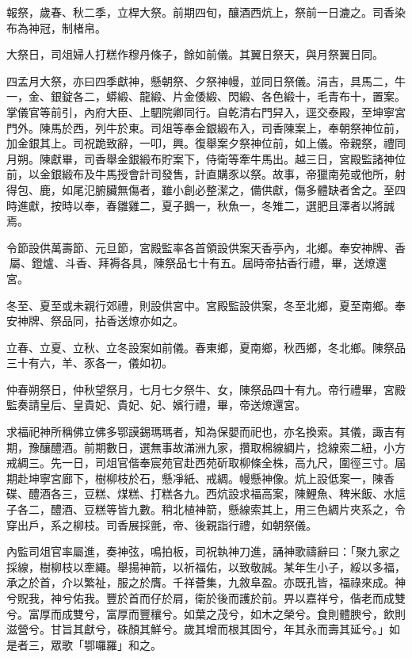 \begin{pinyinscope}
報祭，歲春、秋二季，立桿大祭。前期四旬，釀酒西炕上，祭前一日漉之。司香染布為神冠，制楮帛。

大祭日，司俎婦人打糕作穆丹條子，餘如前儀。其翼日祭天，與月祭翼日同。

四孟月大祭，亦曰四季獻神，懸朝祭、夕祭神幔，並同日祭儀。涓吉，具馬二，牛一，金、銀錠各二，蟒緞、龍緞、片金倭緞、閃緞、各色緞十，毛青布十，置案。掌儀官等前引，內府大臣、上駟院卿同行。自乾清右門舁入，逕交泰殿，至坤寧宮門外。陳馬於西，列牛於東。司俎等奉金銀緞布入，司香陳案上，奉朝祭神位前，加金銀其上。司祝跪致辭，一叩，興。復舉案夕祭神位前，如上儀。帝親祭，禮同月朔。陳獻畢，司香舉金銀緞布貯案下，侍衛等牽牛馬出。越三日，宮殿監諸神位前，以金銀緞布及牛馬授會計司發售，計直購豕以祭。故事，帝獵南苑或他所，射得包、鹿，如尾氾腑臟無傷者，雖小創必整潔之，備供獻，傷多體缺者舍之。至四時進獻，按時以奉，春雛雞二，夏子鵝一，秋魚一，冬雉二，選肥且澤者以將誠焉。

令節設供萬壽節、元旦節，宮殿監率各首領設供案天香亭內，北鄉。奉安神牌、香屬、鐙爐、斗香、拜褥各具，陳祭品七十有五。屆時帝拈香行禮，畢，送燎還宮。

冬至、夏至或未親行郊禮，則設供宮中。宮殿監設供案，冬至北鄉，夏至南鄉。奉安神牌、祭品同，拈香送燎亦如之。

立春、立夏、立秋、立冬設案如前儀。春東鄉，夏南鄉，秋西鄉，冬北鄉。陳祭品三十有六，羊、豕各一，儀如初。

仲春朔祭日，仲秋望祭月，七月七夕祭牛、女，陳祭品四十有九。帝行禮畢，宮殿監奏請皇后、皇貴妃、貴妃、妃、嬪行禮，畢，帝送燎還宮。

求福祀神所稱佛立佛多鄂謨錫瑪瑪者，知為保嬰而祀也，亦名換索。其儀，諏吉有期，豫釀醴酒。前期數日，選無事故滿洲九家，攢取棉線綢片，捻線索二紐，小方戒綢三。先一日，司俎官偕奉宸苑官赴西苑斫取柳條全株，高九尺，圍徑三寸。屆期赴坤寧宮廊下，樹柳枝於石，懸凈紙、戒綢。幔懸神像。炕上設低案一，陳香碟、醴酒各三，豆糕、煤糕、打糕各九。西炕設求福高案，陳鯉魚、稗米飯、水訄子各二，醴酒、豆糕等皆九數。稍北植神箭，懸線索其上，用三色綢片夾系之，令穿出戶，系之柳枝。司香展採氈，帝、後親詣行禮，如朝祭儀。

內監司俎官率屬進，奏神弦，鳴拍板，司祝執神刀進，誦神歌禱辭曰：「聚九家之採線，樹柳枝以牽繩。舉揚神箭，以祈福佑，以致敬誠。某年生小子，綏以多福，承之於首，介以繁祉，服之於膺。千祥薈集，九敘阜盈。亦既孔皆，福祿來成。神兮貺我，神兮佑我。豐於首而仔於肩，衛於後而護於前。畀以嘉祥兮，偕老而成雙兮。富厚而成雙兮，富厚而豐穰兮。如葉之茂兮，如木之榮兮。食則體腴兮，飲則滋營兮。甘旨其獻兮，硃顏其鮮兮。歲其增而根其固兮，年其永而壽其延兮。」如是者三，眾歌「鄂囉羅」和之。


\end{pinyinscope}
